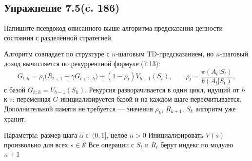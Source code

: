 \subsection{Упражнение 7.5(c. 186)}
Напишите псевдокод описанного выше алгоритма предсказания ценности состояния
с разделённой стратегией.
\begin{solution}
    Алгоритм совпадает по структуре с $n$-шаговым TD-предсказанием, но
    $n$-шаговый доход вычисляется по рекуррентной формуле (7.13):
    \[
    G_{t:h} = \rho_t\bigl(R_{t+1} + \gamma G_{t+1:h}\bigr)
    + (1-\rho_t)V_{h-1}(S_t), \qquad \rho_t = \frac{\pi(A_t|S_t)}{b(A_t|S_t)},
    \]
    с базой $G_{h:h} = V_{h-1}(S_h)$. Рекурсия разворачивается в один цикл,
    идущий от $h$ к $\tau$: переменная $G$ инициализируется базой и на каждом
    шаге пересчитывается. Дополнительной памяти не требуется --- значения
    $\rho_k$, $R_{k+1}$, $S_k$ алгоритм уже хранит.

    \begin{algorithm}[H]
        \DontPrintSemicolon
        Параметры: размер шага $\alpha \in (0,1]$, целое $n > 0$\;
        Инициализировать $V(s)$ произвольно для всех $s \in \mathcal{S}$\;
        Все операции с $S_t$ и $R_t$ берут индекс по модулю $n+1$\;
        \BlankLine
        \caption{$n$-шаговое предсказание $V \approx v_\pi$ с разделённой
        стратегией и переменным управлением}
    \end{algorithm}
\end{solution}

